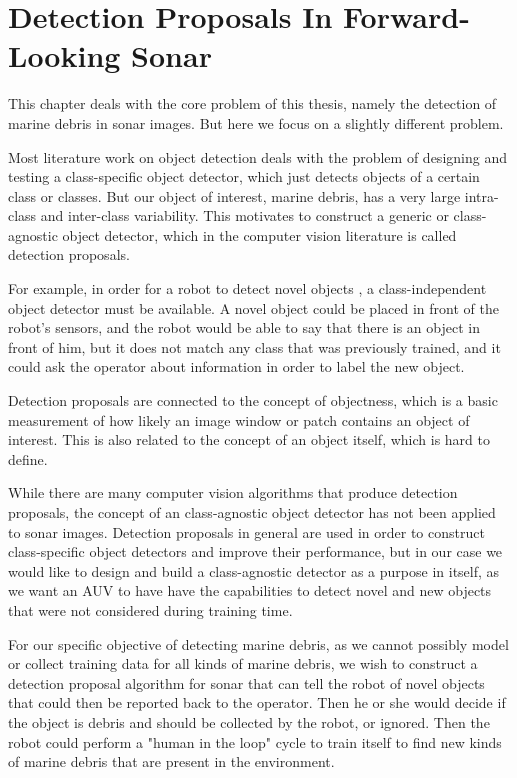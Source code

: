 \chapter[Detection Proposals In Forward-Looking Sonar]{Detection Proposals In \newline Forward-Looking Sonar}
\label{chapter:proposals}

This chapter deals with the core problem of this thesis, namely the detection of marine debris in sonar images. But here we focus on a slightly different problem.

Most literature work on object detection deals with the problem of designing and testing a class-specific object detector, which just detects objects of a certain class or classes. But our object of interest, marine debris, has a very large intra-class and inter-class variability. This motivates to construct a generic or class-agnostic object detector, which in the computer vision literature is called detection proposals.

For example, in order for a robot to detect novel objects \cite{endres2010category}, a class-independent object detector must be available. A novel object could be placed in front of the robot's sensors, and the robot would be able to say that there is an object in front of him, but it does not match any class that was previously trained, and it could ask the operator about information in order to label the new object.

Detection proposals are connected to the concept of objectness, which is a basic measurement of how likely an image window or patch contains an object of interest. This is also related to the concept of an object itself, which is hard to define.

While there are many computer vision algorithms that produce detection proposals, the concept of an class-agnostic object detector has not been applied to sonar images. Detection proposals in general are used in order to construct class-specific object detectors and improve their performance, but in our case we would like to design and build a class-agnostic detector as a purpose in itself, as we want an AUV to have have the capabilities to detect novel and new objects that were not considered during training time.

For our specific objective of detecting marine debris, as we cannot possibly model or collect training data for all kinds of marine debris, we wish to construct a detection proposal algorithm for sonar that can tell the robot of novel objects that could then be reported back to the operator. Then he or she would decide if the object is debris and should be collected by the robot, or ignored. Then the robot could perform a "human in the loop" cycle to train itself to find new kinds of marine debris that are present in the environment.

